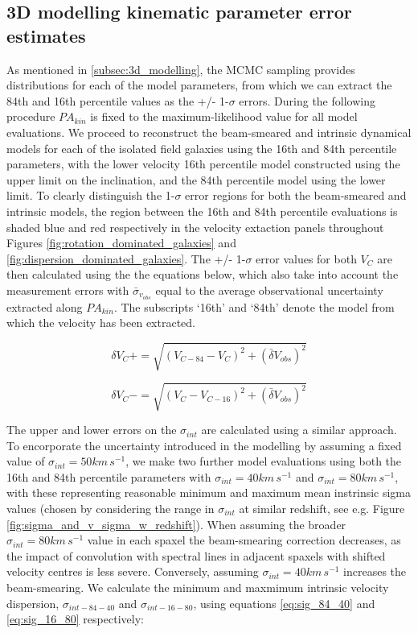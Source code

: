 \documentclass[fleqn,usenatbib]{mnras}
\begin{document}
\subsection{3D modelling kinematic parameter error estimates}\label{appsubsec:model_errors}
As mentioned in \cref{subsec:3d_modelling}, the MCMC sampling provides distributions for each of the model parameters, from which we can extract the 84th and 16th percentile values as the +/- 1-$\sigma$ errors.
During the following procedure $PA_{kin}$ is fixed to the maximum-likelihood value for all model evaluations.
We proceed to reconstruct the beam-smeared and intrinsic dynamical models for each of the isolated field galaxies using the 16th and 84th percentile parameters, with the lower velocity 16th percentile model constructed using the upper limit on the inclination, and the 84th percentile model using the lower limit.
To clearly distinguish the 1-$\sigma$ error regions for both the beam-smeared and intrinsic models, the region between the 16th and 84th percentile evaluations is shaded blue and red respectively in the velocity extaction panels throughout Figures \ref{fig:rotation_dominated_galaxies} and \ref{fig:dispersion_dominated_galaxies}.
The +/- 1-$\sigma$ error values for both $V_{C}$ are then calculated using the the equations below, which also take into account the measurement errors with $\bar{\sigma}_{v_{obs}}$ equal to the average observational uncertainty extracted along $PA_{kin}$.
The subscripts `16th' and `84th' denote the model from which the velocity has been extracted.


\begin{equation}\label{eq:VC_plus}
   \delta V_{C}+ = \sqrt{\left(V_{C-84} - V_{C}\right)^{2} + \left(\bar{\delta}V_{obs}\right)^{2}}
\end{equation}

\begin{equation}\label{eq:VC_minus}
   \delta V_{C}- = \sqrt{\left(V_{C} - V_{C-16}\right)^{2}  + \left(\bar{\delta}V_{obs}\right)^{2}}
\end{equation}

\noindent
The upper and lower errors on the $\sigma_{int}$ are calculated using a similar approach.
To encorporate the uncertainty introduced in the modelling by assuming a fixed value of $\sigma_{int}=50 km\,s^{-1}$, we make two further model evaluations using both the 16th and 84th percentile parameters with $\sigma_{int} = 40 km\,s^{-1}$ and $\sigma_{int} = 80 km\,s^{-1}$, with these representing reasonable minimum and maximum mean instrinsic sigma values (chosen by considering the range in $\sigma_{int}$ at similar redshift, see e.g. Figure \ref{fig:sigma_and_v_sigma_w_redshift}).
When assuming the broader $\sigma_{int} = 80 km\,s^{-1}$ value in each spaxel the beam-smearing correction decreases, as the impact of convolution with spectral lines in adjacent spaxels with shifted velocity centres is less severe.
Conversely, assuming $\sigma_{int} = 40 km\,s^{-1}$ increases the beam-smearing.
We calculate the minimum and maxmimum intrinsic velocity dispersion, $\sigma_{int-84-40}$ and $\sigma_{int-16-80}$, using equations \ref{eq:sig_84_40} and \ref{eq:sig_16_80} respectively:
\end{document}
